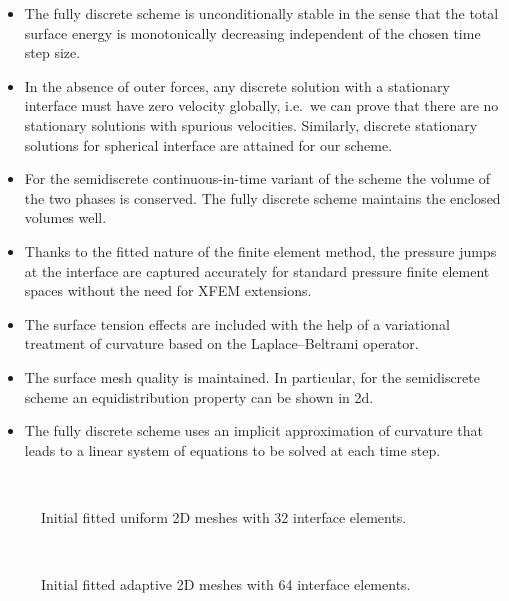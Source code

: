 \documentclass[a4paper,12pt,onecolumn]{article}
\begin{document}
\begin{itemize}
\item The fully discrete scheme is unconditionally stable in the sense that the
total surface energy is monotonically decreasing independent of the chosen time
step size.
\item In the absence of outer forces, any discrete solution with a stationary
interface must have zero velocity globally, i.e.\ we can prove that there are no
stationary solutions with spurious velocities. Similarly, discrete stationary
solutions for spherical interface are attained for our scheme.
\item For the semidiscrete continuous-in-time variant of the scheme the volume
of the two phases is conserved. The fully discrete scheme maintains the enclosed
volumes well.
\item Thanks to the fitted nature of the finite element method, the pressure
jumps at the interface are captured accurately for standard pressure finite
element spaces without the need for XFEM extensions.
\item The surface tension effects are included with the help of a variational
treatment of curvature based on the Laplace--Beltrami operator.
\item The surface mesh quality is maintained. In particular, for the
semidiscrete scheme an equidistribution property can be shown in 2d.
\item The fully discrete scheme uses an implicit approximation of curvature
that leads to a linear system of equations to be solved at each time step.
\end{itemize}

\begin{figure}[htbp]
  \centering
  \quad
  \\
  \caption{Initial fitted uniform 2D meshes with 32 interface elements.}
  \label{fig:meshes_uniform}
\end{figure}

\begin{figure}[htbp]
  \centering
  \quad
  \\
  \caption{Initial fitted adaptive 2D meshes with 64 interface elements.}
  \label{fig:meshes_adaptive}
\end{figure}
\end{document}
